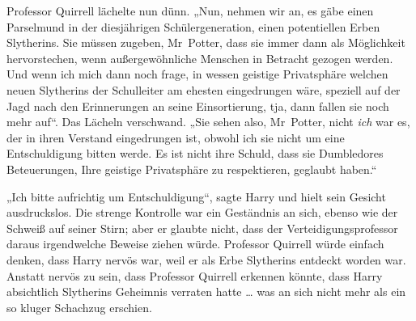 Professor Quirrell lächelte nun dünn.
„Nun, nehmen wir an, es gäbe einen Parselmund in der diesjährigen Schülergeneration, einen potentiellen Erben Slytherins. Sie müssen zugeben, Mr~Potter, dass sie immer dann als Möglichkeit hervorstechen, wenn außergewöhnliche Menschen in Betracht gezogen werden. Und wenn ich mich dann noch frage, in wessen geistige Privatsphäre welchen neuen Slytherins der Schulleiter am ehesten eingedrungen wäre, speziell auf der Jagd nach den Erinnerungen an seine Einsortierung, tja, dann fallen sie noch mehr auf“. Das Lächeln verschwand.
„Sie sehen also, Mr~Potter, nicht \emph{ich} war es, der in ihren Verstand eingedrungen ist, obwohl ich sie nicht um eine Entschuldigung bitten werde. Es ist nicht ihre Schuld, dass sie Dumbledores Beteuerungen, Ihre geistige Privatsphäre zu respektieren, geglaubt haben.“

„Ich bitte aufrichtig um Entschuldigung“, sagte Harry und hielt sein Gesicht ausdruckslos. Die strenge Kontrolle war ein Geständnis an sich, ebenso wie der Schweiß auf seiner Stirn; aber er glaubte nicht, dass der Verteidigungsprofessor daraus irgendwelche Beweise ziehen würde. Professor Quirrell würde einfach denken, dass Harry nervös war, weil er als Erbe Slytherins entdeckt worden war. Anstatt nervös zu sein, dass Professor Quirrell erkennen könnte, dass Harry absichtlich Slytherins Geheimnis verraten hatte … was an sich nicht mehr als ein so kluger Schachzug erschien.

